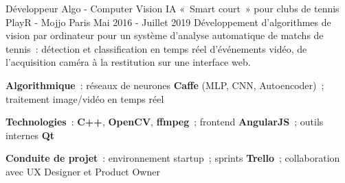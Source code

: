 \begin{cventries}
	\cventry
	{Développeur Algo - Computer Vision}
	{IA «~Smart court~» pour clubs de tennis}
	{PlayR - Mojjo} %
	{Paris} %
	{Mai 2016 - Juillet 2019} %
	{Développement d'algorithmes de vision par ordinateur pour un système d'analyse automatique de matchs de tennis~: détection et classification en temps réel d'événements vidéo, de l'acquisition caméra à la restitution sur une interface web.} %
	{
		\begin{cvitems}
			\item{\textbf{Algorithmique}~: réseaux de neurones \textbf{Caffe} (MLP, CNN, Autoencoder)~; traitement image\slash vidéo en temps réel}
			\item{\textbf{Technologies}~: \textbf{C++}, \textbf{OpenCV}, \textbf{ffmpeg}~; frontend \textbf{AngularJS}~; outils internes \textbf{Qt}}
			\item{\textbf{Conduite de projet}~: environnement startup~; sprints \textbf{Trello}~; collaboration avec UX Designer et Product Owner}
		\end{cvitems}
	}

\end{cventries}
